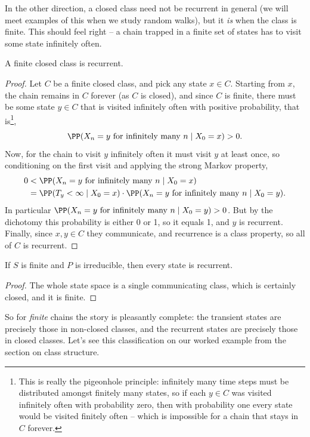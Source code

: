 In the other direction, a closed class need not be recurrent in general (we will meet examples of this when we study random walks), but it \emph{is} when the class is finite. This should feel right -- a chain trapped in a finite set of states has to visit some state infinitely often.

\begin{theorem}
	A finite closed class is recurrent.
\end{theorem}
\begin{proof}
	Let $C$ be a finite closed class, and pick any state $x \in C$. Starting from $x$, the chain remains in $C$ forever (as $C$ is closed), and since $C$ is finite, there must be some state $y \in C$ that is visited infinitely often with positive probability, that is\footnote{This is really the pigeonhole principle: infinitely many time steps must be distributed amongst finitely many states, so if each $y \in C$ was visited infinitely often with probability zero, then with probability one every state would be visited finitely often -- which is impossible for a chain that stays in $C$ forever.},
	$$
	\PP(X_n = y \text{ for infinitely many } n \mid X_0 = x) > 0.
	$$
	Now, for the chain to visit $y$ infinitely often it must visit $y$ at least once, so conditioning on the first visit and applying the strong Markov property,
	\begin{align*}
		0 &< \PP(X_n = y \text{ for infinitely many } n \mid X_0 = x) \\
		&= \PP(T_y < \infty \mid X_0 = x) \cdot \PP(X_n = y \text{ for infinitely many } n \mid X_0 = y).
	\end{align*}
	In particular $\PP(X_n = y \text{ for infinitely many } n \mid X_0 = y) > 0$. But by the dichotomy this probability is either 0 or 1, so it equals 1, and $y$ is recurrent. Finally, since $x, y \in C$ they communicate, and recurrence is a class property, so all of $C$ is recurrent.
\end{proof}

\begin{corollary}
	If $S$ is finite and $P$ is irreducible, then every state is recurrent.
\end{corollary}
\begin{proof}
	The whole state space is a single communicating class, which is certainly closed, and it is finite.
\end{proof}

So for \emph{finite} chains the story is pleasantly complete: the transient states are precisely those in non-closed classes, and the recurrent states are precisely those in closed classes. Let's see this classification on our worked example from the section on class structure.

